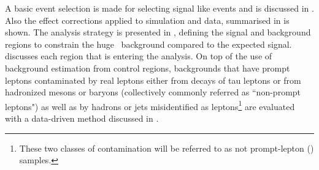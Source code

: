  A basic event selection is made for selecting signal like events and is discussed in . Also the effect corrections applied to simulation and data, summarised in  is shown. The analysis strategy is presented in , defining the signal and background regions to constrain the huge \SM\ background compared to the expected signal.  discusses each region that is entering the analysis. On top of the use of background estimation from control regions, backgrounds that have  prompt leptons  contaminated by real leptons either
from decays of tau leptons or from hadronized mesons or baryons
(collectively commonly referred as ``non-prompt leptons") as well as by
hadrons or jets misidentified as leptons\footnote{These two classes
	of contamination will be referred to as not prompt-lepton (\NPL) samples.} are
evaluated with a data-driven method discussed in .

